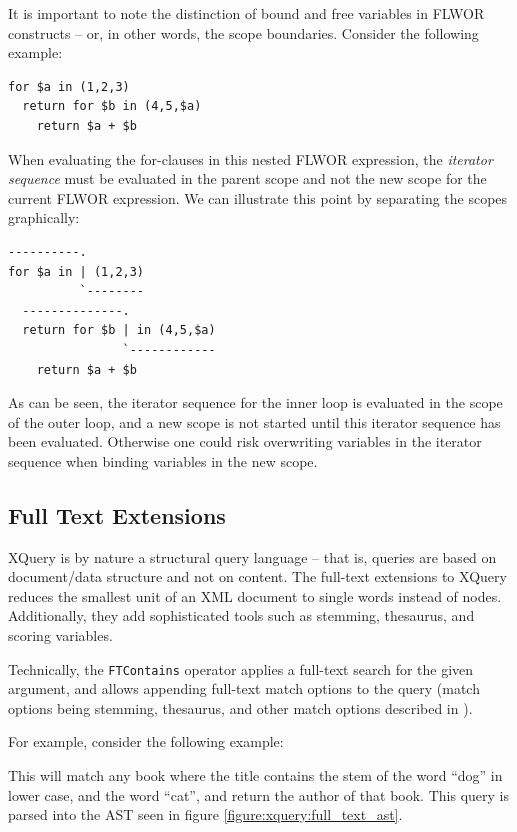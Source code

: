 It is important to note the distinction of bound and free variables in FLWOR
constructs -- or, in other words, the scope boundaries. Consider the following
example:
\begin{Verbatim}
for $a in (1,2,3)
  return for $b in (4,5,$a)
    return $a + $b
\end{Verbatim}
When evaluating the for-clauses in this nested FLWOR expression, the
\textit{iterator sequence} must be evaluated in the parent scope and not the
new scope for the current FLWOR expression. We can illustrate this point by
separating the scopes graphically:
\begin{Verbatim}
----------.
for $a in | (1,2,3)
          `--------
  --------------.
  return for $b | in (4,5,$a)
                `------------
    return $a + $b
\end{Verbatim}
As can be seen, the iterator sequence for the inner loop is evaluated in the
scope of the outer loop, and a new scope is not started until this iterator
sequence has been evaluated. Otherwise one could risk overwriting variables in
the iterator sequence when binding variables in the new scope.


\subsection{Full Text Extensions}
\label{sect:theory:xquery:fulltext_ext}
XQuery is by nature a structural query language -- that is, queries are based on
document/data structure and not on content. The full-text extensions to XQuery
reduces the smallest unit of an XML document to single words instead of nodes.
Additionally, they add sophisticated tools such as stemming, thesaurus, and
scoring variables.

Technically, the \verb!FTContains! operator applies a full-text search for the
given argument, and allows appending full-text match options to the query
(match options being stemming, thesaurus, and other match options described in
\cite{w3c01}).

For example, consider the following example:

This will match any book where the title contains the stem of the word ``dog'' in
lower case, and the word ``cat'', and return the author of that book. This
query is parsed into the AST seen in figure \ref{figure:xquery:full_text_ast}.

